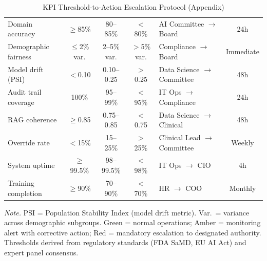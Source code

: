 {\tablestripes\tablefontsize
{}
\begin{xltabular}{\textwidth}{@{} L c c c L c @{}}
\caption[KPI Threshold-to-Action Escalation Protocol (Appendix)]{KPI Threshold-to-Action Escalation Protocol (Appendix)}\label{tab:kpi_escalation_app} \\
\toprule
{} &  &  &  &  &  \\
\midrule
\endfirsthead
\endhead
\bottomrule
\endlastfoot
Domain accuracy & $\geq$85\% & 80--85\% & $<$80\% & AI Committee $\to$ Board & 24h \\
\addlinespace
Demographic fairness & $\leq$2\% var. & 2--5\% var. & $>$5\% var. & Compliance $\to$ Board & Immediate \\
\addlinespace
Model drift (PSI) & $<$0.10 & 0.10--0.25 & $>$0.25 & Data Science $\to$ Committee & 48h \\
\addlinespace
Audit trail coverage & 100\% & 95--99\% & $<$95\% & IT Ops $\to$ Compliance & 24h \\
\addlinespace
RAG coherence & $\geq$0.85 & 0.75--0.85 & $<$0.75 & Data Science $\to$ Clinical & 48h \\
\addlinespace
Override rate & $<$15\% & 15--25\% & $>$25\% & Clinical Lead $\to$ Committee & Weekly \\
\addlinespace
System uptime & $\geq$99.5\% & 98--99.5\% & $<$98\% & IT Ops $\to$ CIO & 4h \\
\addlinespace
Training completion & $\geq$90\% & 70--90\% & $<$70\% & HR $\to$ COO & Monthly \\
\end{xltabular}}
\vspace{0.5em}\noindent\textit{Note.} PSI = Population Stability Index (model drift metric). Var.\ = variance across demographic subgroups. Green = normal operations; Amber = monitoring alert with corrective action; Red = mandatory escalation to designated authority. Thresholds derived from regulatory standards (FDA SaMD, EU AI Act) and expert panel consensus.

